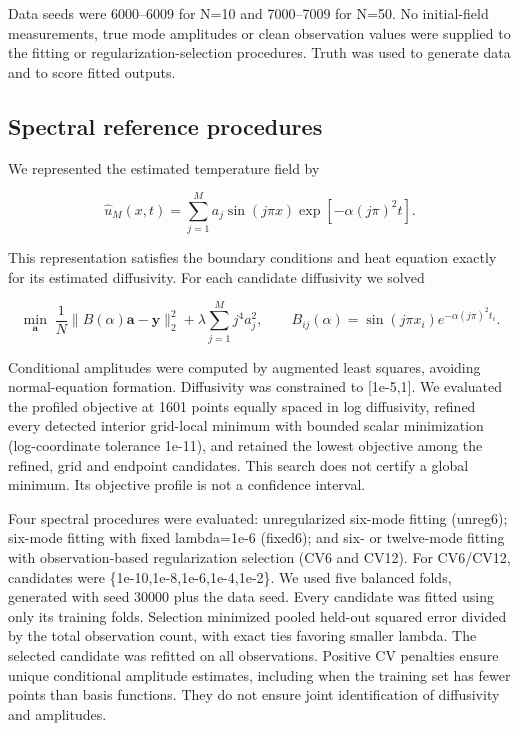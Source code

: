 \documentclass[10pt,a4paper]{article}
\begin{document}
Data seeds were 6000–6009 for N=10 and 7000–7009 for N=50. No initial-field
measurements, true mode amplitudes or clean observation values were supplied to
the fitting or regularization-selection procedures. Truth was used to generate
data and to score fitted outputs.

\subsection{Spectral reference procedures}

We represented the estimated temperature field by

\begin{equation}
\widehat u_M(x,t)=\sum_{j=1}^M a_j\sin(j\pi x)
                          \exp[-\alpha(j\pi)^2t].
\end{equation}

This representation satisfies the boundary conditions and heat equation exactly
for its estimated diffusivity. For each candidate diffusivity we solved

\begin{equation}
\min_{\boldsymbol a}\;
 \frac{1}{N}\lVert B(\alpha)\boldsymbol a-\boldsymbol y\rVert_2^2
 +\lambda\sum_{j=1}^{M}j^4a_j^2,
\qquad B_{ij}(\alpha)=\sin(j\pi x_i)e^{-\alpha(j\pi)^2t_i}.
\end{equation}

Conditional amplitudes were computed by augmented least squares, avoiding
normal-equation formation. Diffusivity was constrained to [1e-5,1]. We evaluated
the profiled objective at 1601 points equally spaced in log diffusivity, refined
every detected interior grid-local minimum with bounded scalar minimization
(log-coordinate tolerance 1e-11), and retained the lowest objective among the
refined, grid and endpoint candidates. This search does not certify a global
minimum. Its objective profile is not a confidence interval.

Four spectral procedures were evaluated: unregularized six-mode fitting
(unreg6); six-mode fitting with fixed lambda=1e-6 (fixed6); and six- or twelve-mode
fitting with observation-based regularization selection (CV6 and CV12).
For CV6/CV12, candidates were \{1e-10,1e-8,1e-6,1e-4,1e-2\}. We used five balanced
folds, generated with seed 30000 plus the data seed. Every candidate was fitted
using only its training folds. Selection minimized pooled held-out squared error
divided by the total observation count, with exact ties favoring smaller lambda.
The selected candidate was refitted on all observations. Positive CV penalties
ensure unique conditional amplitude estimates, including when the training set
has fewer points than basis functions. They do not ensure joint identification
of diffusivity and amplitudes.
\end{document}
